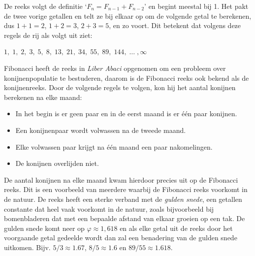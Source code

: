 \documentclass{article}
\begin{document}
De reeks volgt de definitie `\(F_n = F_{n-1} + F_{n-2}\)' en begint meestal bij 1. Het pakt de twee vorige getallen en telt ze bij elkaar op om de volgende getal te berekenen, dus \(1 + 1 = 2\), \(1 + 2 = 3\), \(2 + 3 = 5\), en zo voort. Dit betekent dat volgens deze regels de rij als volgt uit ziet: 

\(1,\;1,\;2,\;3,\;5,\;8,\;13,\;21,\;34,\;55,\;89,\;144,\; \ldots\;, \infty\)

Fibonacci heeft de reeks in \textit{Liber Abaci} opgenomen om een probleem over konijnenpopulatie te bestuderen, daarom is de Fibonacci reeks ook bekend als de konijnenreeks. Door de volgende regels te volgen, kon hij het aantal konijnen berekenen na elke maand:

\begin{itemize}
\item{In het begin is er geen paar en in de eerst maand is er \'e\'en paar konijnen.}
\item{Een konijnenpaar wordt volwassen na de tweede maand.}
\item{Elke volwassen paar krijgt na \'e\'en maand een paar nakomelingen.}
\item{De konijnen overlijden niet.}
\end{itemize}

De aantal konijnen na elke maand kwam hierdoor precies uit op de Fibonacci reeks. Dit is een voorbeeld van meerdere waarbij de Fibonacci reeks voorkomt in de natuur. De reeks heeft een sterke verband met de \textit{gulden snede}, een getallen constante dat heel vaak voorkomt in de natuur, zoals bijvoorbeeld bij bomenbladeren dat met een bepaalde afstand van elkaar groeien op een tak. De gulden snede komt neer op \(\varphi \approx 1{,}618\) en als elke getal uit de reeks door het voorgaande getal gedeelde wordt dan zal een benadering van de gulden snede uitkomen. Bijv. \(5/3 \approx 1.67\), \(8/5 \approx 1.6\) en \(89/55 \approx 1.618\).
\end{document}
